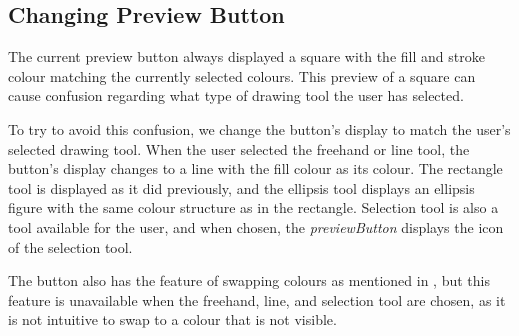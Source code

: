 \subsection{Changing Preview Button}
The current preview button always displayed a square with the fill and stroke colour matching the currently selected colours.
This preview of a square can cause confusion regarding what type of drawing tool the user has selected.

To try to avoid this confusion, we change the button's display to match the user's selected drawing tool.
When the user selected the freehand or line tool, the button's display changes to a line with the fill colour as its colour.
The rectangle tool is displayed as it did previously, and the ellipsis tool displays an ellipsis figure with the same colour structure as in the rectangle.
Selection tool is also a tool available for the user, and when chosen, the \textit{previewButton} displays the icon of the selection tool.

The button also has the feature of swapping colours as mentioned in , but this feature is unavailable when the freehand, line, and selection tool are chosen, as it is not intuitive to swap to a colour that is not visible. 